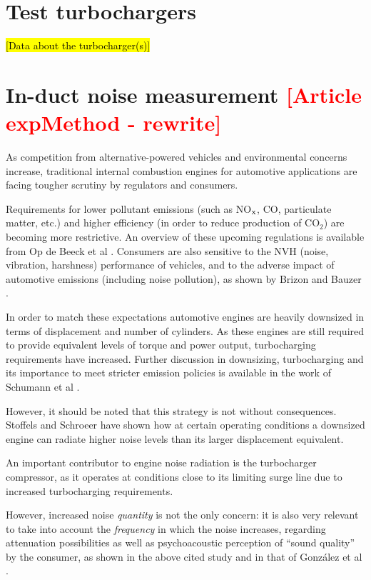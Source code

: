 \section{Test turbochargers}

\hl{[Data about the turbocharger(s)]}

\section{In-duct noise measurement \textcolor{red}{[Article expMethod - rewrite]}} %
As competition from alternative-powered vehicles and environmental concerns increase, traditional internal combustion engines for automotive applications are facing tougher scrutiny by regulators and consumers.

Requirements for lower pollutant emissions (such as NO${}_\text x$, CO, particulate matter, etc.) and higher efficiency (in order to reduce production of CO${}_2$) are becoming more restrictive. An overview of these upcoming regulations is available from Op de Beeck et al \cite{deBeeck2013upcoming}. Consumers are also sensitive to the NVH (noise, vibration, harshness) performance of vehicles, and to the adverse impact of automotive emissions (including noise pollution), as shown by Brizon and Bauzer \cite{brizon2012combining}.

In order to match these expectations automotive engines are heavily downsized in terms of displacement and number of cylinders. As these engines are still required to provide equivalent levels of torque and power output, turbocharging requirements have increased. Further discussion in downsizing, turbocharging and its importance to meet stricter emission policies is available in the work of Schumann et al \cite{schumann2012potential}.

However, it should be noted that this strategy is not without consequences. Stoffels and Schroeer \cite{stoffels2003nvh} have shown how at certain operating conditions a downsized engine can radiate higher noise levels than its larger displacement equivalent.

An important contributor to engine noise radiation is the turbocharger compressor, as it operates at conditions close to its limiting surge line \cite{teng2009investigation} due to increased turbocharging requirements.

However, increased noise \textit{quantity} is not the only concern: it is also very relevant to take into account the \textit{frequency} in which the noise increases, regarding attenuation possibilities as well as psychoacoustic perception of ``sound quality'' by the consumer, as shown in the above cited study \cite{brizon2012combining} and in that of González et al \cite{gonzalez2003sound}.

